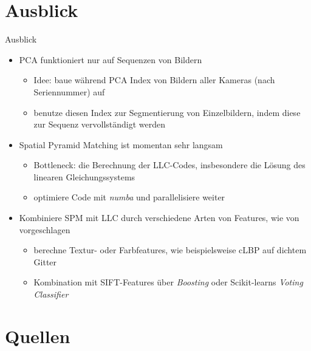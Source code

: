 \section{Ausblick}
\begin{frame}[t,fragile]{Ausblick}
	\begin{itemize}
		\item PCA funktioniert nur auf Sequenzen von Bildern
		\begin{itemize}
			\item Idee: baue während PCA Index von Bildern aller Kameras (nach Seriennummer) auf
			\item benutze diesen Index zur Segmentierung von Einzelbildern, indem diese zur Sequenz vervollständigt werden
		\end{itemize}
		\item Spatial Pyramid Matching ist momentan sehr langsam
		\begin{itemize}
			\item Bottleneck: die Berechnung der LLC-Codes, insbesondere die Lösung des linearen Gleichungssystems
			\item optimiere Code mit \emph{numba} und parallelisiere weiter \cite{numba}
		\end{itemize}
		\item Kombiniere SPM mit LLC durch verschiedene Arten von Features, wie von \cite{ywkjwh13} vorgeschlagen
		\begin{itemize}
			\item berechne Textur- oder Farbfeatures, wie beispielsweise cLBP auf dichtem Gitter
			\item Kombination mit SIFT-Features über \emph{Boosting} oder Scikit-learns \emph{Voting Classifier}
		\end{itemize} 
	\end{itemize}
\end{frame}

\nocite{*}
\section*{Quellen}
\begin{frame}[allowframebreaks,t]{\secname}
	\printbibliography
\end{frame}

